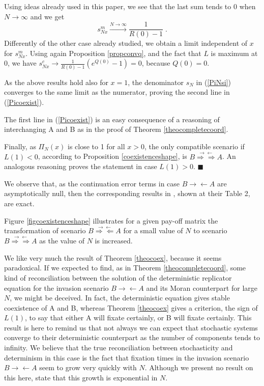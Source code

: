 \documentclass[12pt]{article}
\begin{document}
Using ideas already used in this paper, we see that the last sum tends to 0 when $N \rightarrow \infty$ and we get
\begin{equation}
s^m_{Nx} \stackrel{N \rightarrow \infty}{\rightarrow} \frac{1}{R(0)-1} \;.
\end{equation}
Differently of the other case already studied, we obtain a limit independent of $x$ for $s^m_{Nx}$. 
Using again Proposition \ref{propconvq}, and the fact that $L$ is maximum at 0, we have $s^c_{Nx}\rightarrow \frac{1}{R(0)-1} (e^{Q(0)}-1)=0$, because $Q(0)=0$.

As the above results hold also for $x=1$, the denominator $s_N$ in (\ref{PiNsi}) converges to the same limit as the numerator, proving the second line in (\ref{Picoexist}). 

The first line in (\ref{Picoexist}) is an easy consequence of a reasoning of interchanging A and B as in the proof of Theorem \ref{theocompletecoord}.

Finally, as $\Pi_N(x)$ is close to 1 for all $x>0$, the only compatible scenario if $L(1)<0$, according to Proposition \ref{coexistenceshape}, is $B\stackrel{\rightarrow \leftarrow}{\Rightarrow \Rightarrow} A$. An analogous reasoning proves the statement in case $L(1)>0$.
$\blacksquare$

We observe that, as the continuation error terms in case $B\rightarrow \leftarrow A$ are asymptotically null, then the corresponding results in \cite{AntalScheuring}, shown at their Table 2, are exact.

Figure \ref{figcoexistenceshape} illustrates for a given pay-off matrix the transformation of scenario $B\stackrel{\rightarrow \leftarrow}{\Rightarrow \Leftarrow} A$ for a small value of $N$ to scenario $B\stackrel{\rightarrow \leftarrow}{\Rightarrow \Rightarrow} A$ as the value of $N$ is increased.

We like very much the result of Theorem \ref{theocoex}, because it seems paradoxical. If we expected to find, as in Theorem \ref{theocompletecoord}, some kind of reconciliation between the solution of the deterministic replicator equation for the invasion scenario $B\rightarrow \leftarrow A$ and its Moran counterpart for large $N$, we might be deceived. In fact, the deterministic equation gives stable coexistence of A and B, whereas Theorem \ref{theocoex} gives a criterion, the sign of $L(1)$, to say that either A will fixate certainly, or B will fixate certainly. This result is here to remind us that not always we can expect that stochastic systems converge to their deterministic counterpart as the number of components tends to infinity. We believe that the true reconciliation between stochasticity and determinism in this case is the fact that fixation times in the invasion scenario $B\rightarrow \leftarrow A$ seem to grow very quickly with $N$. Although we present no result on this here, \cite{AntalScheuring} state that this growth is exponential in $N$.
\end{document}
